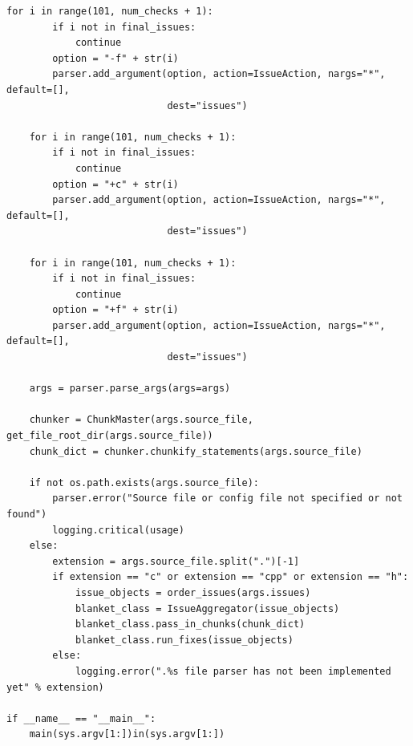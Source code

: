 \documentclass[11pt]{scrreprt}
\begin{document}
\begin{lstlisting}[frame=single,basicstyle=\small]
    for i in range(101, num_checks + 1):
        if i not in final_issues:
            continue
        option = "-f" + str(i)
        parser.add_argument(option, action=IssueAction, nargs="*", default=[],
                            dest="issues")

    for i in range(101, num_checks + 1):
        if i not in final_issues:
            continue
        option = "+c" + str(i)
        parser.add_argument(option, action=IssueAction, nargs="*", default=[],
                            dest="issues")

    for i in range(101, num_checks + 1):
        if i not in final_issues:
            continue
        option = "+f" + str(i)
        parser.add_argument(option, action=IssueAction, nargs="*", default=[],
                            dest="issues")

    args = parser.parse_args(args=args)

    chunker = ChunkMaster(args.source_file, get_file_root_dir(args.source_file))
    chunk_dict = chunker.chunkify_statements(args.source_file)

    if not os.path.exists(args.source_file):
        parser.error("Source file or config file not specified or not found")
        logging.critical(usage)
    else:
        extension = args.source_file.split(".")[-1]
        if extension == "c" or extension == "cpp" or extension == "h":
            issue_objects = order_issues(args.issues)
            blanket_class = IssueAggregator(issue_objects)
            blanket_class.pass_in_chunks(chunk_dict)
            blanket_class.run_fixes(issue_objects)
        else:
            logging.error(".%s file parser has not been implemented yet" % extension)

if __name__ == "__main__":
    main(sys.argv[1:])in(sys.argv[1:])

\end{lstlisting}
\end{document}

